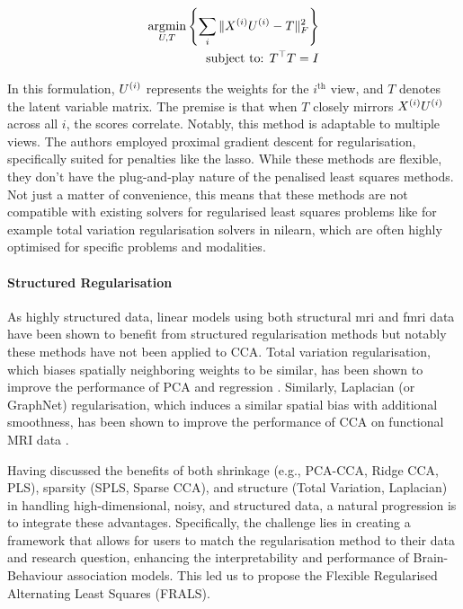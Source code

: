 \begin{align}
    \label{eq:fu}
    \underset{U, T}{\mathrm{argmin}}\left\{\sum_i \|X^{(i)} U^{(i)} - T\|_F^2\right\}\\
    \text{subject to: }T^\top T = I\\
\end{align}

In this formulation, \(U^{(i)}\) represents the \gls{weights} for the $i^{\text{th}}$ view, and \(T\) denotes the latent variable matrix.
The premise is that when \(T\) closely mirrors \(X^{(i)} U^{(i)}\) across all \(i\), the scores correlate.
Notably, this method is adaptable to multiple views.
The authors employed proximal gradient descent for regularisation, specifically suited for penalties like the lasso.
While these methods are flexible, they don't have the plug-and-play nature of the penalised least squares methods.
Not just a matter of convenience, this means that these methods are not compatible with existing solvers for regularised least squares problems like for example total variation regularisation solvers in nilearn, which are often highly optimised for specific problems and modalities.

\paragraph{Structured Regularisation}

As highly structured data, linear models using both structural \acrshort{mri} and f\acrshort{mri} data have been shown to benefit from structured regularisation methods but notably these methods have not been applied to CCA.
Total variation regularisation, which biases spatially neighboring weights to be similar, has been shown to improve the performance of PCA \citep{de2017structured} and regression \citep{michel2011total,dohmatob2014benchmarking, baldassarre2012structured}.
Similarly, Laplacian (or GraphNet) regularisation, which induces a similar spatial bias with additional smoothness, has been shown to improve the performance of CCA on functional MRI data \citep{grosenick2013interpretable,cuingnet2012spatial}.

Having discussed the benefits of both shrinkage (e.g., PCA-CCA, Ridge CCA, PLS), sparsity (SPLS, Sparse CCA), and structure (Total Variation, Laplacian) in handling high-dimensional, noisy, and structured data, a natural progression is to integrate these advantages.
Specifically, the challenge lies in creating a framework that allows for users to match the regularisation method to their data and research question, enhancing the interpretability and performance of Brain-Behaviour association models.
This led us to propose the Flexible Regularised Alternating Least Squares (FRALS).

